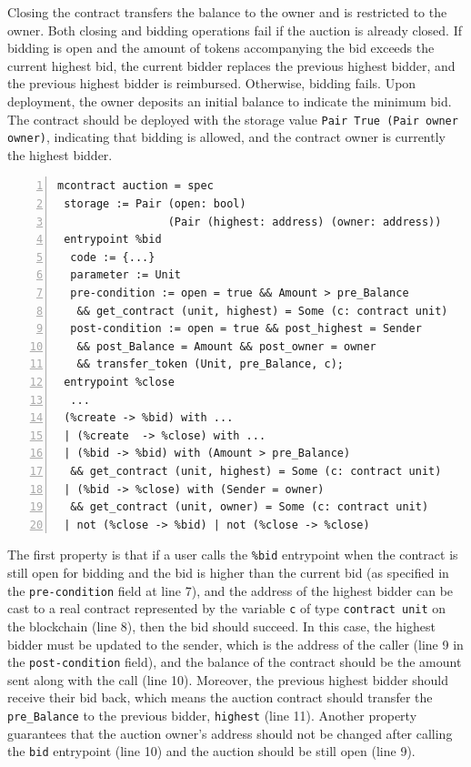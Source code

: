 \documentclass[runningheads]{llncs}
\begin{document}
Closing the contract transfers the balance to the owner and is restricted to the owner. Both closing and bidding operations fail if the auction is already closed. If bidding is open and the amount of tokens accompanying the bid exceeds the current highest bid, the current bidder replaces the previous highest bidder, and the previous highest bidder is reimbursed. Otherwise, bidding fails. Upon deployment, the owner deposits an initial balance to indicate the minimum bid. The contract should be deployed with the storage value \lstinline|Pair True (Pair owner owner)|, indicating that bidding is allowed, and the contract owner is currently the highest bidder.

\begin{lstlisting}[float=tp,captionpos=b,caption={Auction contract specification},label={lst:auction-contract-specification1},numbers=left]
mcontract auction = spec 
 storage := Pair (open: bool) 
                 (Pair (highest: address) (owner: address))
 entrypoint %bid
  code := {...}
  parameter := Unit 
  pre-condition := open = true && Amount > pre_Balance
   && get_contract (unit, highest) = Some (c: contract unit)
  post-condition := open = true && post_highest = Sender 
   && post_Balance = Amount && post_owner = owner 
   && transfer_token (Unit, pre_Balance, c);
 entrypoint %close
  ...
 (%create -> %bid) with ...
 | (%create  -> %close) with ...
 | (%bid -> %bid) with (Amount > pre_Balance) 
  && get_contract (unit, highest) = Some (c: contract unit)
 | (%bid -> %close) with (Sender = owner) 
  && get_contract (unit, owner) = Some (c: contract unit)
 | not (%close -> %bid) | not (%close -> %close)
\end{lstlisting}

The first property is that if a user calls the \lstinline|%bid| entrypoint when the contract is still open for bidding and the bid is higher than the current bid (as specified in the \lstinline|pre-condition| field at line 7), and the address of the highest bidder can be cast to a real contract represented by the variable \lstinline|c| of type \lstinline|contract unit| on the blockchain (line 8), then the bid should succeed. In this case, the highest bidder must be updated to the sender, which is the address of the caller (line 9 in the \lstinline|post-condition| field), and the balance of the contract should be the amount sent along with the call (line 10). Moreover, the previous highest bidder should receive their bid back, which means the auction contract should transfer the \lstinline|pre_Balance| to the previous bidder, \lstinline|highest| (line 11). Another property guarantees that the auction owner's address should not be changed after calling the \lstinline/bid/ entrypoint (line 10) and the auction should be still open (line 9). 
\end{document}
